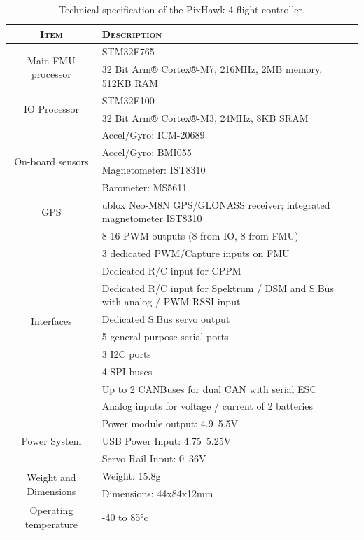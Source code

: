 \begin{table}[h]
    \centering
    \begin{tabular}{cp{27em}}
        \toprule \textsc{Item} & \textsc{Description}\\
        \midrule
        \multirow{2}{*}{Main FMU processor} & STM32F765 \\
        & 32 Bit Arm® Cortex®-M7, 216MHz, 2MB memory, 512KB RAM \\
        \midrule
        \multirow{2}{*}{IO Processor} & STM32F100 \\
        & 32 Bit Arm® Cortex®-M3, 24MHz, 8KB SRAM \\
        \midrule
        \multirow{4}{*}{On-board sensors} & Accel/Gyro: ICM-20689 \\
        & Accel/Gyro: BMI055 \\
        & Magnetometer: IST8310 \\
        & Barometer: MS5611 \\
        \midrule
        GPS & ublox Neo-M8N GPS/GLONASS receiver; integrated magnetometer IST8310 \\
        \midrule
        \multirow{10}{*}{Interfaces} & 8-16 PWM outputs (8 from IO, 8 from FMU) \\
        & 3 dedicated PWM/Capture inputs on FMU \\
        & Dedicated R/C input for CPPM \\
        & Dedicated R/C input for Spektrum / DSM and S.Bus with analog / PWM RSSI input \\
        & Dedicated S.Bus servo output \\
        & 5 general purpose serial ports \\
        & 3 I2C ports \\
        & 4 SPI buses \\
        & Up to 2 CANBuses for dual CAN with serial ESC \\
        & Analog inputs for voltage / current of 2 batteries \\
        \midrule
        \multirow{3}{*}{Power System} & Power module output: 4.9~5.5V \\
        & USB Power Input: 4.75~5.25V \\
        & Servo Rail Input: 0~36V \\
        \midrule
        \multirow{2}{*}{Weight and Dimensions} & Weight: 15.8g \\
        & Dimensions: 44x84x12mm \\
        \midrule
        Operating temperature & -40 to 85°c \\
        \bottomrule
    \end{tabular}
    \caption[PixHawk 4 Specification]{Technical specification of the PixHawk 4 flight controller.}
    \label{tab:chapter2:drone:px4fc}
\end{table}


